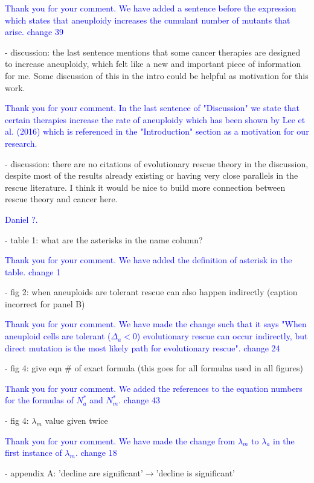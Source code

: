 \documentclass[11pt,a4paper]{article}
\begin{document}
\textcolor{blue}{Thank you for your comment. We have added a sentence before the expression which states that aneuploidy increases the cumulant number of mutants that arise. change 39} 

- discussion: the last sentence mentions that some cancer therapies are designed to increase aneuploidy, which felt like a new and important piece of information for me. Some discussion of this in the intro could be helpful as motivation for this work.

\textcolor{blue}{Thank you for your comment. In the last sentence of "Discussion" we state that certain therapies increase the rate of aneuploidy which has been shown by Lee et al. (2016) which is referenced in the "Introduction" section as a motivation for our research.} 

- discussion: there are no citations of evolutionary rescue theory in the discussion, despite most of the results already existing or having very close parallels in the rescue literature. I think it would be nice to build more connection between rescue theory and cancer here.

\textcolor{blue}{Daniel ?.} 

- table 1: what are the asterisks in the name column?

\textcolor{blue}{Thank you for your comment. We have added the definition of asterisk in the table. change 1} 

- fig 2: when aneuploids are tolerant rescue can also happen indirectly (caption incorrect for panel B)

\textcolor{blue}{Thank you for your comment. We have made the change such that it says "When aneuploid cells are tolerant ($\Delta_a<0$) evolutionary rescue can occur indirectly, but direct mutation is the most likely path for evolutionary rescue". change 24} 

- fig 4: give eqn $\#$ of exact formula (this goes for all formulas used in all figures)

\textcolor{blue}{Thank you for your comment. We added the references to the equation numbers for the formulas of $N_a^*$ and $N_m^*$. change 43} 

- fig 4: $\lambda_m$ value given twice

\textcolor{blue}{Thank you for your comment. We have made the change from $\lambda_m$ to $\lambda_a$ in the first instance of $\lambda_m$. change 18} 

- appendix A: 'decline are significant'$\rightarrow$'decline is significant'
\end{document}
